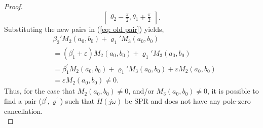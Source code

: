 \begin{proof}
\begin{equation}
\begin{bmatrix}
    \theta_2-\frac{\pi}{2}, \theta_1+\frac{\pi}{2}
\end{bmatrix}.
\end{equation}
Substituting the new pairs in (\ref{eq: old pair}) yields,
\begin{align}
\label{eq: neq}
    &\beta_2 ' M_2(a_0,b_0)+\varrho_1 'M_3(a_0,b_0) \\ \nonumber
    &=(\beta_1^{'}+\varepsilon)M_2(a_0,b_0)+\varrho_1 'M_3(a_0,b_0) \\ \nonumber
     &=\beta_1^{'}M_2(a_0,b_0)+\varrho_1 'M_3(a_0,b_0)+\varepsilon M_2(a_0,b_0) \\ \nonumber
      &=\varepsilon M_2(a_0,b_0)\neq0.
\end{align}
Thus, for the case that $M_2(a_0,b_0)\neq0$, and/or $M_3(a_0,b_0)\neq0$, it is possible to find a pair ($\beta^{'}, \varrho^{'}$) such that $H(j\omega)$ be SPR and does not have any pole-zero cancellation.\\


\end{proof}
